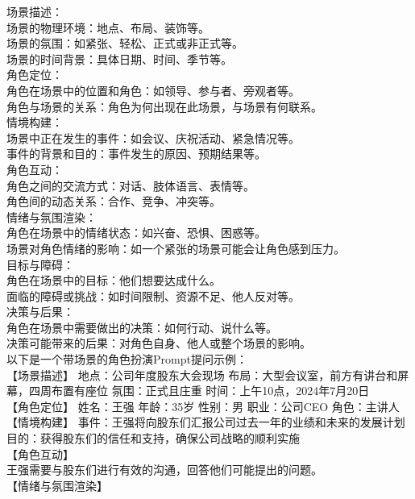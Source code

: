\documentclass[12pt]{book}
\begin{document}
场景描述：\\
场景的物理环境：地点、布局、装饰等。\\
场景的氛围：如紧张、轻松、正式或非正式等。\\
场景的时间背景：具体日期、时间、季节等。\\
角色定位：\\
角色在场景中的位置和角色：如领导、参与者、旁观者等。\\
角色与场景的关系：角色为何出现在此场景，与场景有何联系。\\
情境构建：\\
场景中正在发生的事件：如会议、庆祝活动、紧急情况等。\\
事件的背景和目的：事件发生的原因、预期结果等。\\
角色互动：\\
角色之间的交流方式：对话、肢体语言、表情等。\\
角色间的动态关系：合作、竞争、冲突等。\\
情绪与氛围渲染：\\
角色在场景中的情绪状态：如兴奋、恐惧、困惑等。\\
场景对角色情绪的影响：如一个紧张的场景可能会让角色感到压力。\\
目标与障碍：\\
角色在场景中的目标：他们想要达成什么。\\
面临的障碍或挑战：如时间限制、资源不足、他人反对等。\\
决策与后果：\\
角色在场景中需要做出的决策：如何行动、说什么等。\\
决策可能带来的后果：对角色自身、他人或整个场景的影响。\\
以下是一个带场景的角色扮演Prompt提问示例：\\

【场景描述】 地点：公司年度股东大会现场 布局：大型会议室，前方有讲台和屏幕，四周布置有座位 氛围：正式且庄重 时间：上午10点，2024年7月20日\\

【角色定位】 姓名：王强 年龄：35岁 性别：男 职业：公司CEO 角色：主讲人\\

【情境构建】 事件：王强将向股东们汇报公司过去一年的业绩和未来的发展计划 目的：获得股东们的信任和支持，确保公司战略的顺利实施\\

【角色互动】\\

王强需要与股东们进行有效的沟通，回答他们可能提出的问题。\\
【情绪与氛围渲染】\\
\end{document}
